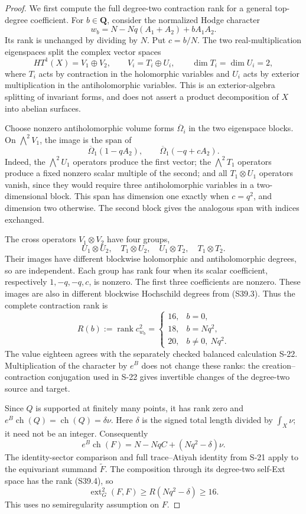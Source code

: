 \begin{proof}
We first compute the full degree-two contraction rank for a general
top-degree coefficient. For $b\in\mathbf Q$, consider the normalized
Hodge character
\[
 w_b=N-Nq(A_1+A_2)+bA_1A_2.
\]
Its rank is unchanged by dividing by $N$. Put $c=b/N$. The two
real-multiplication eigenspaces split the complex vector spaces
\[
 HT^1(X)=V_1\oplus V_2,
 \qquad V_i=T_i\oplus U_i,
 \qquad \dim T_i=\dim U_i=2,
\]
where $T_i$ acts by contraction in the holomorphic variables and $U_i$
acts by exterior multiplication in the antiholomorphic variables. This is
an exterior-algebra splitting of invariant forms, and does not assert a
product decomposition of $X$ into abelian surfaces.

Choose nonzero antiholomorphic volume forms $\overline\Omega_i$ in the
two eigenspace blocks. On $\bigwedge^2V_1$, the image is the span of
\[
 \overline\Omega_1(1-qA_2),\qquad
 \overline\Omega_1(-q+cA_2).
 \tag{S39.3}
\]
Indeed, the $\bigwedge^2U_1$ operators produce the first vector;
the $\bigwedge^2T_1$ operators produce a fixed nonzero scalar multiple
of the second; and all $T_1\otimes U_1$ operators vanish, since they
would require three antiholomorphic variables in a two-dimensional block.
This span has dimension one exactly when $c=q^2$, and dimension two
otherwise. The second block gives the analogous span with indices exchanged.

The cross operators $V_1\otimes V_2$ have four groups,
\[
 U_1\otimes U_2,\quad T_1\otimes U_2,\quad
 U_1\otimes T_2,\quad T_1\otimes T_2.
\]
Their images have different blockwise holomorphic and antiholomorphic
degrees, so are independent. Each group has rank four when its scalar
coefficient, respectively $1,-q,-q,c$, is nonzero. The first three
coefficients are nonzero. These images are also in different blockwise
Hochschild degrees from (S39.3). Thus the complete contraction rank is
\[
 R(b):=\operatorname{rank}c^2_{w_b}
 =\begin{cases}
 16,&b=0,\\
 18,&b=Nq^2,\\
 20,&b\ne0,\ Nq^2.
 \end{cases}
 \tag{S39.4}
\]
The value eighteen agrees with the separately checked balanced calculation
S-22. Multiplication of the character by $e^B$ does not change these ranks:
the creation--contraction conjugation used in S-22 gives invertible changes
of the degree-two source and target.

Since $Q$ is supported at finitely many points, it has rank zero and
$e^B\operatorname{ch}(Q)=\operatorname{ch}(Q)=\delta\nu$.
Here $\delta$ is the signed total length divided by
$\int_X\nu$; it need not be an integer. Consequently
\[
 e^B\operatorname{ch}(F)
   =N-NqC+(Nq^2-\delta)\nu.
 \tag{S39.5}
\]
The identity-sector comparison and full trace--Atiyah identity from S-21
apply to the equivariant summand $\widetilde F$. The composition through
its degree-two self-Ext space has the rank (S39.4), so
\[
 \operatorname{ext}^2_G(F,F)\ge R(Nq^2-\delta)\ge16.
 \tag{S39.6}
\]
This uses no semiregularity assumption on $F$.


\end{proof}
